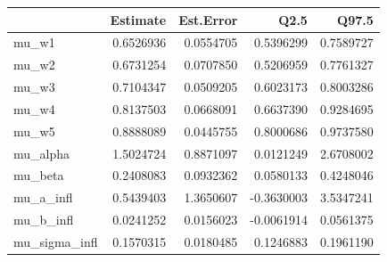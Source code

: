 
\begin{tabular}{lrrrr}
\toprule
  & Estimate & Est.Error & Q2.5 & Q97.5\\
\midrule
mu\_w1 & 0.6526936 & 0.0554705 & 0.5396299 & 0.7589727\\
mu\_w2 & 0.6731254 & 0.0707850 & 0.5206959 & 0.7761327\\
mu\_w3 & 0.7104347 & 0.0509205 & 0.6023173 & 0.8003286\\
mu\_w4 & 0.8137503 & 0.0668091 & 0.6637390 & 0.9284695\\
mu\_w5 & 0.8888089 & 0.0445755 & 0.8000686 & 0.9737580\\
\addlinespace
mu\_alpha & 1.5024724 & 0.8871097 & 0.0121249 & 2.6708002\\
mu\_beta & 0.2408083 & 0.0932362 & 0.0580133 & 0.4248046\\
mu\_a\_infl & 0.5439403 & 1.3650607 & -0.3630003 & 3.5347241\\
mu\_b\_infl & 0.0241252 & 0.0156023 & -0.0061914 & 0.0561375\\
mu\_sigma\_infl & 0.1570315 & 0.0180485 & 0.1246883 & 0.1961190\\
\bottomrule
\end{tabular}
